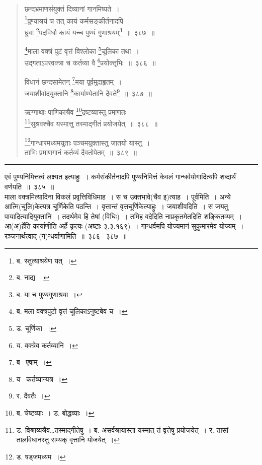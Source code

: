 \documentclass[11pt, openany]{book}
\begin{document}
\begin{quote}
{\na छन्दभ्रमाणसंयुक्तं दिव्यानां गानमिष्यते~।\\
 \renewcommand{\thefootnote}{1}\footnote{ब. स्तुत्याश्रयेण यत्~।}पुण्याश्रयं च तत् कायं कर्मसङ्कीर्तनादपि~।\\
 ध्रुवा \renewcommand{\thefootnote}{2}\footnote{ब. नाद्य~।}पदविधौ कायं यच्च पुण्यं गुणाश्रयम्\renewcommand{\thefootnote}{3}\footnote{ब. या च पुण्यगुणाश्रया~।}~॥~३८७~॥

 \renewcommand{\thefootnote}{4}\footnote{ब. मला वक्त्रपुटो वृत्तं चूलिकाऽनुष्टबेव च~।}माला वक्त्रं पुटं वृत्तं विश्लोका \renewcommand{\thefootnote}{5}\footnote{ड. चूर्णिका~।}चूलिका तथा~।\\
 उद्गताऽपरवक्त्रा च कर्तव्या वै \renewcommand{\thefootnote}{6}\footnote{य. वक्त्रेव कर्तव्यानि~।}प्रयोक्तृभिः~॥~३८६~॥

 विधानं छन्दसामेतन् \renewcommand{\thefootnote}{7}\footnote{ब \textendash\ एषाम्~।}मया पूर्वमुदाहृतम्~।\\
 जयाशीर्वादयुक्तानि \renewcommand{\thefootnote}{8}\footnote{य \textendash\ कर्तव्यान्यत्र~।}कार्याण्येतानि दैवते\renewcommand{\thefootnote}{9}\footnote{र. दैवतैः~।}~॥~३८७~॥

 ऋग्गाथाः पाणिकाश्रैव \renewcommand{\thefootnote}{10}\footnote{ब. चेष्टव्याः~। ड. बोद्धव्याः~।}द्रष्टव्यास्तु प्रमाणतः~।\\
 \renewcommand{\thefootnote}{11}\footnote{ड. विश्राव्यश्रैव\ldots तस्माद्गीतेषु~। ब. असर्वश्रायास्ता यस्मात् तं वृत्तेषु प्रयोजयेत्~। र. तासां तालविधानस्तु सम्यक् वृत्तानि योजयेत्~।}सुश्रवश्चैव यस्मात्तु तस्माद्गीतं प्रयोजयेत्~॥~३८८~॥

 \renewcommand{\thefootnote}{12}\footnote{ड. षड्जमध्यम~।}गान्धारमध्यमयुताः पञ्चमयुक्तास्तु जातयो यास्तु~।\\
 ताभिः प्रमाणगानं कर्तव्यं दैवतोपेतम्~॥~३८९~॥}
\end{quote}

\hrule

\vspace{2mm}
एवं पुण्यनिमित्तत्वं लक्ष्यत इत्याहुः~। {\qtt कर्मसंकीर्तनादपि} पुण्यनिमित्तं केवलं गान्धर्वयोगादित्यपि शब्दार्थं वर्णयति~॥~३८५~॥\\

माला वक्त्रमित्यादिना विकलं प्रवृत्तिविधिमाह~। स च {\qtt उक्तभावे}(चैव इ)त्याह~। {\qtt पूर्वमिति~।} अन्ये आत्मि(चूलि)केत्यत्र चूर्णिकेति पठन्ति~। वृत्तान्तं {\qtt वृत्तचूर्णिकेत्याहुः}~। जयाशीवदिति~। स जयतु पायादित्यादियुक्तानि~। तदर्थमेव हि तेषां (विधिः)~। तमिह वदेदिति नाप्रकृतमेतदिति शङ्कितव्यम्~। आ(अ)र्हेति कार्याणीति अर्हे कृत्यः (अष्टाः ३.३.१६९)~। गान्धर्वमपि योज्यमानं सुकुमारमेव योज्यम्~। रञ्जनार्थत्वाद् (ग)न्धर्वाणामिति~॥~३८६ \textendash\ ३८७~॥\\
\end{document}
